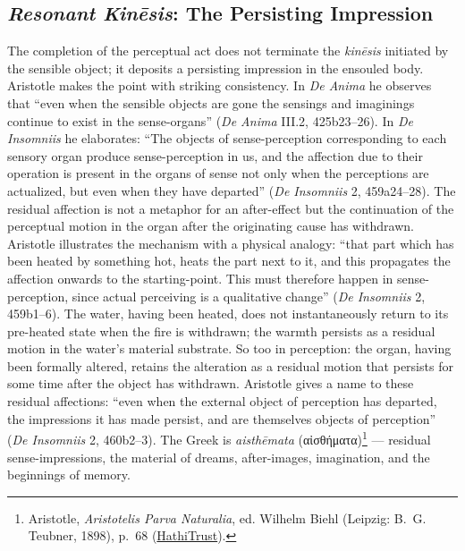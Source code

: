 \documentclass{article}
\newcommand{\gk}[1]{{\greekfont #1}}
\begin{document}
\subsection{\textit{Resonant Kinēsis}: The Persisting Impression}

The completion of the perceptual act does not terminate the \textit{kinēsis} initiated by the sensible object; it deposits a persisting impression in the ensouled body. Aristotle makes the point with striking consistency. In \textit{De Anima} he observes that ``even when the sensible objects are gone the sensings and imaginings continue to exist in the sense-organs'' (\textit{De Anima} III.2, 425b23--26). In \textit{De Insomniis} he elaborates: ``The objects of sense-perception corresponding to each sensory organ produce sense-perception in us, and the affection due to their operation is present in the organs of sense not only when the perceptions are actualized, but even when they have departed'' (\textit{De Insomniis} 2, 459a24--28). The residual affection is not a metaphor for an after-effect but the continuation of the perceptual motion in the organ after the originating cause has withdrawn. Aristotle illustrates the mechanism with a physical analogy: ``that part which has been heated by something hot, heats the part next to it, and this propagates the affection onwards to the starting-point. This must therefore happen in sense-perception, since actual perceiving is a qualitative change'' (\textit{De Insomniis} 2, 459b1--6). The water, having been heated, does not instantaneously return to its pre-heated state when the fire is withdrawn; the warmth persists as a residual motion in the water's material substrate. So too in perception: the organ, having been formally altered, retains the alteration as a residual motion that persists for some time after the object has withdrawn. Aristotle gives a name to these residual affections: ``even when the external object of perception has departed, the impressions it has made persist, and are themselves objects of perception'' (\textit{De Insomniis} 2, 460b2--3). The Greek is \textit{aisthēmata} (\gk{αἰσθήματα})\footnote{Aristotle, \textit{Aristotelis Parva Naturalia}, ed. Wilhelm Biehl (Leipzig: B.~G. Teubner, 1898), p.~68 (\href{https://catalog.hathitrust.org/Record/001227560/Home}{HathiTrust}).} --- residual sense-impressions, the material of dreams, after-images, imagination, and the beginnings of memory.
\end{document}
